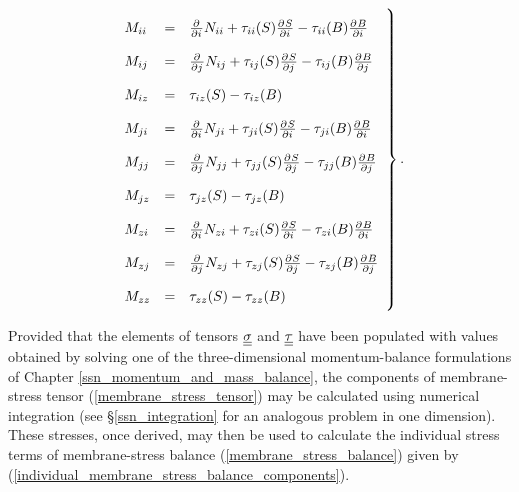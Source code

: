 \begin{align}
\label{individual_membrane_stress_balance_components}
\left.
\def\arraystretch{2}
\begin{array}{lcl}
  M_{ii} &=& \parder{}{i} N_{ii} + \tau_{ii}(S) \parder{S}{i} - \tau_{ii}(B) \parder{B}{i} \\
  M_{ij} &=& \parder{}{j} N_{ij} + \tau_{ij}(S) \parder{S}{j} - \tau_{ij}(B) \parder{B}{j} \\
  M_{iz} &=& \tau_{iz}(S) - \tau_{iz}(B) \\
  M_{ji} &=& \parder{}{i} N_{ji} + \tau_{ji}(S) \parder{S}{i} - \tau_{ji}(B) \parder{B}{i} \\
  M_{jj} &=& \parder{}{j} N_{jj} + \tau_{jj}(S) \parder{S}{j} - \tau_{jj}(B) \parder{B}{j} \\
  M_{jz} &=& \tau_{jz}(S) - \tau_{jz}(B) \\
  M_{zi} &=& \parder{}{i} N_{zi} + \tau_{zi}(S) \parder{S}{i} - \tau_{zi}(B) \parder{B}{i} \\
  M_{zj} &=& \parder{}{j} N_{zj} + \tau_{zj}(S) \parder{S}{j} - \tau_{zj}(B) \parder{B}{j} \\
  M_{zz} &=& \tau_{zz}(S) - \tau_{zz}(B)
\end{array}
\right\}.
\end{align}

Provided that the elements of tensors $\underline{\underline{\sigma}}$ and $\underline{\underline{\tau}}$ have been populated with values obtained by solving one of the three-dimensional momentum-balance formulations of Chapter \ref{ssn_momentum_and_mass_balance}, the components of membrane-stress tensor (\ref{membrane_stress_tensor}) may be calculated using numerical integration (see \S \ref{ssn_integration} for an analogous problem in one dimension).  These stresses, once derived, may then be used to calculate the individual stress terms of membrane-stress balance (\ref{membrane_stress_balance}) given by (\ref{individual_membrane_stress_balance_components}).

